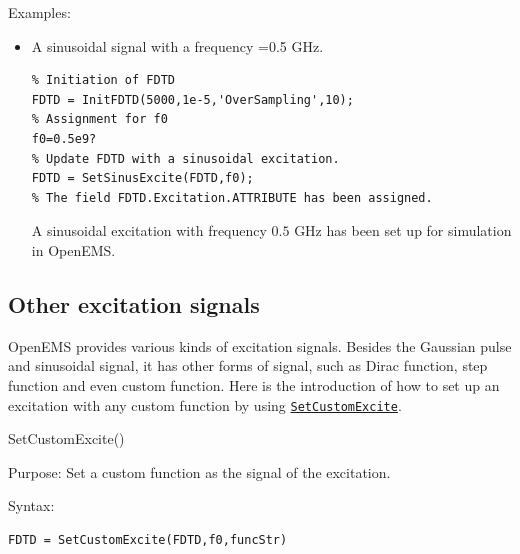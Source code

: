 \begin{FontDescr}{Examples:}
 \begin{itemize}
\item A sinusoidal signal with a frequency =0.5 GHz.
\begin{lstlisting}
% Initiation of FDTD
FDTD = InitFDTD(5000,1e-5,'OverSampling',10);
% Assignment for f0
f0=0.5e9?
% Update FDTD with a sinusoidal excitation.
FDTD = SetSinusExcite(FDTD,f0);
% The field FDTD.Excitation.ATTRIBUTE has been assigned.
\end{lstlisting}
A sinusoidal excitation with frequency $0.5$ GHz has been set up for simulation in OpenEMS.
\end{itemize}
\end{FontDescr}


    \subsection{Other excitation signals}\label{subsec:Other excitation signals}
OpenEMS provides various kinds of excitation signals. Besides the Gaussian pulse and sinusoidal signal, it has other forms of signal, such as Dirac function, step function and even custom function. Here is the introduction of how to set up an excitation with any custom function by using \hyperref[func:SetCustomExcite]{\texttt{SetCustomExcite}}.

\begin{FontNameFunct}{SetCustomExcite()}
 \label{func:SetCustomExcite}
\end{FontNameFunct}

\begin{FontDescr}{Purpose:}
Set a custom function as the signal of the excitation.
\end{FontDescr}

\begin{FontDescr}{Syntax:}
      \begin{lstlisting}
FDTD = SetCustomExcite(FDTD,f0,funcStr)
      \end{lstlisting}
\end{FontDescr}
      
